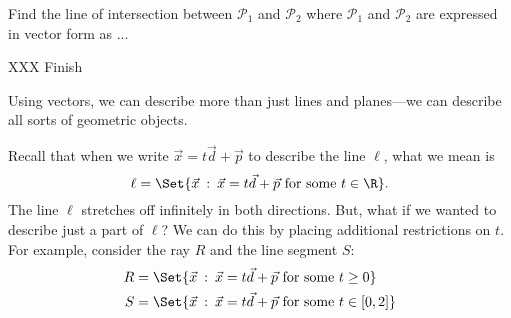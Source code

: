 \begin{example}
	Find the line of intersection between $\mathcal P_1$ and $\mathcal P_2$ where 
	$\mathcal P_1$ and $\mathcal P_2$ are expressed in vector form as ...

	XXX Finish
\end{example}


Using vectors, we can describe more than just lines and planes---we can describe 
all sorts of geometric objects.

Recall that when we write $\vec x=t\vec d+\vec p$
to describe the line $\ell$,
what we mean is
\[
	\ell=\Set{\vec x\given \vec x=t\vec d+\vec p\text{ for some }t\in \R}.
\]
The line $\ell$ stretches off infinitely in both directions. But, what if we wanted
to describe just a part of $\ell$? We can do this by placing additional restrictions
on $t$.
For example, consider the ray $R$
and the line segment $S$:
\begin{align*}
	R&=\Set{\vec x\given \vec x=t\vec d+\vec p\text{ for some }t\geq 0}\\
	S&=\Set{\vec x\given \vec x=t\vec d+\vec p\text{ for some }t\in [0,2]}
\end{align*}

